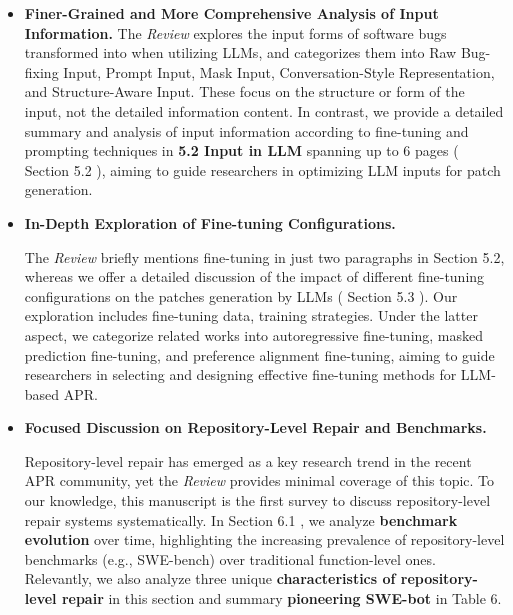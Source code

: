 \documentclass[acmsmall]{acmart}
\begin{document}
	\begin{itemize}
		\item \textbf{Finer-Grained and More Comprehensive Analysis of Input Information.}
			\newline
			The \textit{Review} explores the input forms of software bugs transformed into when utilizing
			LLMs, and categorizes them into Raw Bug-fixing Input, Prompt Input, Mask Input, Conversation-Style
			Representation, and Structure-Aware Input. These focus on the structure or form of the input,
			not the detailed information content. In contrast, we provide a detailed summary and
			analysis of input information according to fine-tuning and prompting techniques in
			\color{blue}
			\textbf{5.2 Input in LLM}
			\color{black}
			spanning up to 6 pages (
			\color{red}
			Section 5.2
			\color{black}
			), aiming to guide researchers in optimizing LLM inputs for patch generation.
			\newline

		\item \textbf{In-Depth Exploration of Fine-tuning Configurations.}

			The \textit{Review} briefly mentions fine-tuning in just two paragraphs in Section 5.2, whereas
			we offer a detailed discussion of the impact of different fine-tuning configurations on the
			patches generation by LLMs (
			\color{red}
			Section 5.3
			\color{black}
			). Our exploration includes fine-tuning data, training strategies. Under the latter
			aspect, we categorize related works into autoregressive fine-tuning, masked prediction
			fine-tuning, and preference alignment fine-tuning, aiming to guide researchers in
			selecting and designing effective fine-tuning methods for LLM-based APR.
			\newline

		\item \textbf{Focused Discussion on Repository-Level Repair and Benchmarks.}

			Repository-level repair has emerged as a key research trend in the recent APR community,
			yet the \textit{Review} provides minimal coverage of this topic. To our knowledge, this manuscript
			is the first survey to discuss repository-level repair systems systematically. In
			\color{red}
			Section 6.1
			\color{black}
			, we analyze \textbf{benchmark evolution} over time, highlighting the increasing
			prevalence of repository-level benchmarks (e.g., SWE-bench) over traditional function-level
			ones. Relevantly, we also analyze three unique \textbf{characteristics of repository-level
			repair} in this section and summary \textbf{pioneering SWE-bot} in
			\color{red}
			Table 6.
			\color{black}
			\newline


\end{itemize}
\end{document}
